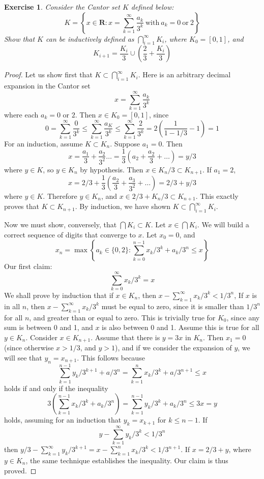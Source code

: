 \documentclass{report}
\theoremstyle{plain}
\newtheorem{exercise}{Exercise}[section]
\theoremstyle{definition}
\begin{document}
\begin{exercise}
    Consider the Cantor set $K$ defined below:
    \[ K = \left\{ x \in \mathbf{R} : x = \sum_{k = 1}^\infty \frac{a_k}{3^k} \ \text{with}\ a_k = 0\ \text{or}\ 2 \right\} \]
    Show that $K$ can be inductively defined as $\bigcap_{i = 1}^\infty K_i$, where $K_0 = [0,1]$, and
    \[ K_{i+1} = \frac{K_i}{3} \cup \left(\frac{2}{3} + \frac{K_i}{3}\right) \]
\end{exercise}
\begin{proof}
    Let us show first that $K \subset \bigcap_{i = 1}^\infty K_i$. Here is an arbitrary decimal expansion in the Cantor set
    \[ x = \sum_{k = 1}^\infty \frac{a_k}{3^k} \]
    where each $a_k = 0$ or $2$. Then $x \in K_0 = [0,1]$, since
    \[ 0 = \sum_{k = 1}^\infty \frac{0}{3^k} \leq \sum_{k = 1}^\infty \frac{a_K}{3^k} \leq \sum_{k = 1}^\infty \frac{2}{3^k} = 2(\frac{1}{1 - 1/3} - 1) = 1 \]
    For an induction, assume $K \subset K_n$. Suppose $a_1 = 0$. Then
    \[ x = \frac{a_1}{3} + \frac{a_2}{3^2} \dots = \frac{1}{3} (a_2 + \frac{a_2}{3} + \dots) = y/3 \]
    where $y \in K$, so $y \in K_n$ by hypothesis. Then $x \in K_n/3 \subset K_{n+1}$. If $a_1 = 2$,
    \[ x = 2/3 + \frac{1}{3}(\frac{a_2}{3} + \frac{a_3}{3^2} + \dots) = 2/3 + y/3 \]
    where $y \in K$. Therefore $y \in K_n$, and $x \in 2/3 + K_n/3 \subset K_{n+1}$. This exactly proves that $K \subset K_{n + 1}$. By induction, we have shown $K \subset \bigcap_{i = 1}^\infty K_i$.

    Now we must show, conversely, that $\bigcap K_i \subset K$. Let $x \in \bigcap K_i$. We will build a correct sequence of digits that converge to $x$. Let $x_0 = 0$, and
    \[ x_n = \max \left\{ a_k \in \{0,2\} : \sum_{k = 0}^{n-1} x_k/3^k + a_k/3^n \leq x \right\} \]
    Our first claim:
    \[ \sum_{k = 0}^\infty x_k/3^k = x \]
    We shall prove by induction that if $x \in K_n$, then $x - \sum_{k = 1}^\infty x_k/3^k < 1/3^n$, If $x$ is in all $n$, then $x - \sum_{k = 1}^\infty x_k/3^k$ must be equal to zero, since it is smaller than $1/3^n$ for all $n$, and greater than or equal to zero. This is trivially true for $K_0$, since any sum is between 0 and 1, and $x$ is also between 0 and 1. Assume this is true for all $y \in K_n$. Consider $x \in K_{n+1}$. Assume that there is $y = 3x$ in $K_n$. Then $x_1 = 0$ (since otherwise $x > 1/3$, and $y > 1$), and if we consider the expansion of $y$, we will see that $y_n = x_{n+1}$. This follows because
    \[ \sum_{k = 1}^{n-1} y_k/3^{k+1} + a/3^n = \sum_{k = 1}^{n} x_k/3^k + a/3^{n+1} \leq x \]
    holds if and only if the inequality
    \[ 3\left(\sum_{k = 1}^{n-1} x_k/3^k + a_k/3^n\right) = \sum_{k = 1}^{n-1} y_k/3^k + a_k/3^n \leq 3x = y \]
    holds, assuming for an induction that $y_k = x_{k+1}$ for $k \leq n-1$. If
    \[ y - \sum_{k = 1}^\infty y_k/3^k < 1/3^n \]
    then $y/3 - \sum_{k = 1}^\infty y_k/3^{k+1} = x - \sum_{k = 1}^n x_k/3^k < 1/3^{n+1}$. If $x = 2/3 + y$, where $y \in K_n$, the same technique establishes the inequality. Our claim is thus proved.
\end{proof}
\end{document}
